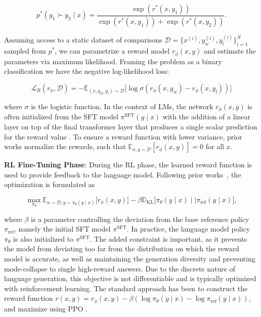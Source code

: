 \begin{equation}\label{eq:bradley-terry}
    p^*(y_1\succ y_2 \mid x)=\frac{\exp\left(r^*(x, y_1)\right)}{\exp\left(r^*(x, y_1)\right) + \exp\left(r^*(x, y_2)\right)}.
\end{equation}

Assuming access to a static dataset of comparisons $\mathcal{D}=\bigl\{x^{(i)}, y_w^{(i)}, y_l^{(i)}\bigr\}_{i=1}^N$ sampled from $p^*$, we can parametrize a reward model $r_{\phi}(x, y)$ and estimate the parameters via maximum likelihood. Framing the problem as a binary classification we have the negative log-likelihood loss:

\begin{equation}\label{eq:reward_model}
    \mathcal{L}_R(r_{\phi}, \mathcal{D}) = -\mathbb{E}_{(x, y_w, y_l)\sim \mathcal{D}}\bigl[\log \sigma(r_{\phi}(x, y_w)- r_{\phi}(x, y_l))\bigr]
\end{equation}

where $\sigma$ is the logistic function. In the context of LMs, the network $r_{\phi}(x, y)$ is often initialized from the SFT model $\pi^\text{SFT}(y \mid x)$ with the addition of a linear layer on top of the final transformer layer that produces a single scalar prediction for the reward value \cite{ziegler2020finetuning}. To ensure a reward function with lower variance, prior works normalize the rewards, such that  $\mathbb{E}_{x,y\sim \mathcal{D}}\left[r_\phi(x, y)\right] = 0$ for all $x$.

\textbf{RL Fine-Tuning Phase}: During the RL phase, the learned reward function is used to provide feedback to the language model. Following prior works~\citep{jaques2017sequence, jaques2020human}, the optimization is formulated as

\begin{equation}\label{eq:RL}
\max_{\pi_{\theta}}  \mathbb{E}_{x\sim \mathcal{D}, y\sim \pi_{\theta}(y \mid x)}\bigl[r_{\phi}(x, y)\bigr] - \beta\mathbb{D}_{\textrm{KL}}\bigl[\pi_{\theta}(y\mid x)\mid \mid \pi_\text{ref}(y\mid x)\bigr],
\end{equation}

where $\beta$ is a parameter controlling the deviation from the base reference policy $\pi_\text{ref}$, namely the initial SFT model $\pi^\text{SFT}$. 
In practice, the language model policy $\pi_\theta$ is also initialized to $\pi^\text{SFT}$. The added constraint is important, as it prevents the model from deviating too far from the distribution on which the reward model is accurate, as well as maintaining the generation diversity and preventing mode-collapse to single high-reward answers. Due to the discrete nature of language generation, this objective is not differentiable and is typically optimized with reinforcement learning. The standard approach \citep{ziegler2020finetuning, stiennon2022learning, bai2022training, ouyang2022training} has been to construct the reward function ${r(x, y) = r_{\phi}(x, y) -\beta (\log \pi_{\theta}(y\mid x) - \log \pi_\text{ref}(y\mid x))}$, and maximize using PPO \cite{schulman2017proximal}. 

